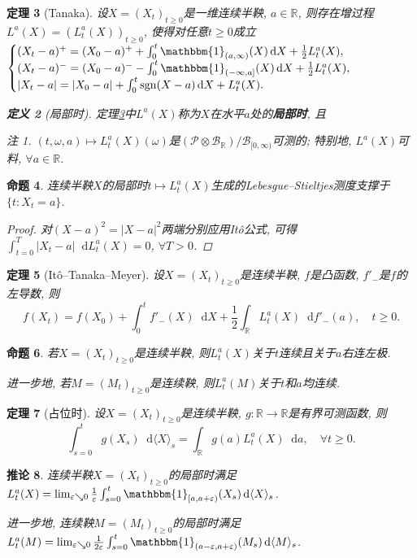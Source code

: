 \documentclass{ctexart}
\theoremstyle{definition}
\newtheorem{Def}{定义}[section]
\theoremstyle{remark}
\newtheorem{Rmk}[Def]{注}
\theoremstyle{plain}
\newtheorem{Prop}[Def]{命题}
\newtheorem{Thm}[Def]{定理}
\newtheorem{Cor}[Def]{推论}
\newcommand{\1}{\mathbbm{1}}				%
\newcommand{\agp}[1]{\langle #1 \rangle}	%
\newcommand{\sgn}[1]{\operatorname{sgn}(#1)}	%
\newcommand{\abs}[1]{\lvert#1\rvert}			%
\newcommand{\R}{\mathbb{R}}					%
\newcommand{\tint}{\textstyle\int\nolimits}
\renewcommand*{\d}{\mathop{}\!\mathrm{d}}	%
\begin{document}
\begin{Thm}[Tanaka]\label{Thm:Tanaka}
设$X = (X_{t})_{t \ge 0}$是一维连续半鞅, $a \in \R$, 则存在增过程$L^{a}(X) = (L_{t}^{a}(X))_{t \ge 0}$, 使得对任意$t \ge 0$成立$\begin{cases}
(X_{t}-a)^{+} = (X_{0}-a)^{+} + \tint_{0}^{t} \1_{(a,\infty)}(X) \d X + \frac{1}{2} L_{t}^{a}(X) , \\
(X_{t}-a)^{-} = (X_{0}-a)^{-} - \tint_{0}^{t} \1_{(-\infty,a]}(X) \d X + \frac{1}{2} L_{t}^{a}(X) , \\
\abs{X_{t}-a} = \abs{X_{0}-a} + \tint_{0}^{t} \sgn{X-a} \d X + L_{t}^{a}(X) . 
\end{cases}$
\begin{Def}[局部时]
定理\ref{Thm:Tanaka}中$L^{a}(X)$称为$X$在水平$a$处的\textbf{局部时}, 且
\begin{Rmk}
$(t,\omega,a) \mapsto L_{t}^{a}(X)(\omega)$是$(\mathscr{P}\otimes\mathscr{B}_{\R})/\mathscr{B}_{[0,\infty)}$可测的; 特别地, $L^{a}(X)$可料, $\forall a \in \R$.
\end{Rmk}
\end{Def}
\end{Thm}

\begin{Prop}
连续半鞅$X$的局部时$t \mapsto L_{t}^{a}(X)$生成的Lebesgue--Stieltjes测度支撑于$\{ t : X_{t} = a \}$.
\begin{proof}
对$(X-a)^{2} = \abs{X-a}^{2}$两端分别应用It\^{o}公式, 可得$\int_{t=0}^{T} \abs{X_{t}-a} \d L^{a}_{t}(X) = 0$, $\forall T > 0$.
\end{proof}
\end{Prop}

\begin{Thm}[It\^{o}--Tanaka--Meyer]
设$X = (X_{t})_{t \ge 0}$是连续半鞅, $f$是凸函数, $f'_{-}$是$f$的左导数, 则
\[ f(X_{t}) = f(X_{0}) + \int_{0}^{t} f'_{-}(X) \d X + \frac{1}{2}\int_{\R} L_{t}^{a}(X) \d f'_{-}(a) , \quad t \ge 0 . \]
\end{Thm}

\begin{Prop}
若$X = (X_{t})_{t \ge 0}$是连续半鞅, 则$L_{t}^{a}(X)$关于$t$连续且关于$a$右连左极. \par
进一步地, 若$M = (M_{t})_{t \ge 0}$是连续鞅, 则$L_{t}^{a}(M)$关于$t$和$a$均连续.
\end{Prop}

\begin{Thm}[占位时]
设$X = (X_{t})_{t \ge 0}$是连续半鞅, $g : \R \to \R$是有界可测函数, 则
\[ \tint_{s=0}^{t} g(X_{s}) \d\agp{X}_{s} = \tint_{\R} g(a) L_{t}^{a}(X) \d a ,\quad \forall t \ge 0 . \]
\end{Thm}
\begin{Cor}
连续半鞅$X = (X_{t})_{t \ge 0}$的局部时满足$L_{t}^{a}(X) = \lim_{\varepsilon \searrow 0} \frac{1}{\varepsilon} \int_{s=0}^{t} \1_{[a,a+\varepsilon)}(X_{s}) \d\agp{X}_{s}$. \par
进一步地, 连续鞅$M = (M_{t})_{t \ge 0}$的局部时满足$L_{t}^{a}(M) = \lim_{\varepsilon \searrow 0} \frac{1}{2\varepsilon} \int_{s=0}^{t} \1_{(a-\varepsilon,a+\varepsilon)}(M_{s}) \d\agp{M}_{s}$.
\end{Cor}
\end{document}
